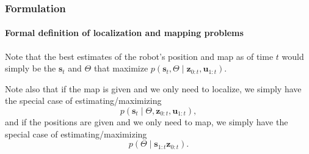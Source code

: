 \documentclass[aspectratio=169]{beamer}
\renewcommand{\vec}[1]{\boldsymbol{#1}}
\newcommand{\myfig}[3]{\centerline{\texttt{[image: \#2]}}
    \centerline{\scriptsize \begin{minipage}{#1} \centering #3 \end{minipage}}}
\begin{document}
\begin{frame}
\frametitle{Formulation}
\framesubtitle{Formal definition of localization and mapping problems}

Note that the
best estimates of the robot's position and map as of time $t$
would simply
be the $\vec{s}_t$ and $\Theta$ that \alert{maximize}
$p(\vec{s}_t, \Theta \mid \vec{z}_{0:t}, \vec{u}_{1:t})$.

\medskip

Note also that if the map is given and we \alert{only need to localize},
     we simply
have the special case of estimating/maximizing
\begin{equation*}
p(\vec{s}_t \mid \Theta, \vec{z}_{0:t}, \vec{u}_{1:t}),
\end{equation*}
and if the positions are given and we \alert{only need to map}, we simply
have the special case of estimating/maximizing
\begin{equation*}
p(\Theta \mid \vec{s}_{1:t} \vec{z}_{0:t}).
\end{equation*}

\end{frame}

\end{document}
